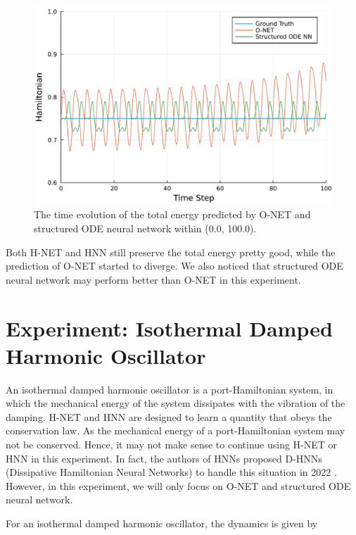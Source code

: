 \documentclass[
	parskip, 			   %
	twoside, 			   %
	DIV=14, 			   %
	BCOR=15.0mm, 		   %
	headsepline, 		   %
	open=right, 		   %
	captions=tableheading, %
	bibliography=totoc,    %
	numbers=noenddot       %
]{scrreprt}
\begin{document}
\clearpage
\begin{figure}[h!]
    \centering
    \includegraphics[scale=0.5]{figures/Hamiltonian_evolution_long_O_NET_and_structured_ODE_NN.pdf}
    \caption{The time evolution of the total energy predicted by O-NET and structured ODE neural network within (0.0, 100.0).}
    \label{fig:Hamiltonian_evolution_long_O_NET_and_structured_ODE_NN}
\end{figure}

Both H-NET and HNN still preserve the total energy pretty good, while the prediction of O-NET started to diverge. We also noticed that structured ODE neural network may perform better than O-NET in this experiment.


\clearpage
\section{Experiment: Isothermal Damped Harmonic Oscillator}
An isothermal damped harmonic oscillator is a port-Hamiltonian system, in which the mechanical energy of the system dissipates with the vibration of the damping. H-NET and HNN are designed to learn a quantity that obeys the conservation law. As the mechanical energy of a port-Hamiltonian system may not be conserved. Hence, it may not make sense to continue using H-NET or HNN in this experiment. In fact, the authors of HNNs proposed D-HNNs (Dissipative Hamiltonian Neural Networks) to handle this situation in 2022 \cite{greydanus2022dissipative}. However, in this experiment, we will only focus on O-NET and structured ODE neural network.

For an isothermal damped harmonic oscillator, the dynamics is given by
\end{document}
